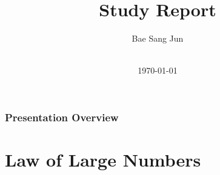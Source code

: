 \documentclass[
	10pt, %
]{beamer}
\title[Study Report]{Study Report} %
\author[Bae Sang Jun]{Bae Sang Jun} %
\institute[Unist]{UNIST \\ \smallskip \textit{bsjuntiger@unist.ac.kr}} %
\date[\today]{ \\ \today} %
\begin{document}

\begin{frame}
	\titlepage %
\end{frame}



\begin{frame}
	\frametitle{Presentation Overview} %
	
	\tableofcontents %
\end{frame}


\section{Law of Large Numbers}
\end{document}
